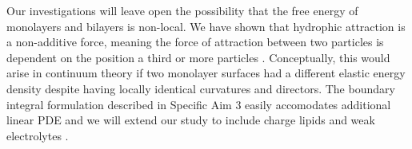  
%  
%

Our investigations will leave open the possibility that the free energy of monolayers and bilayers is non-local. 
We have shown that hydrophic attraction is a non-additive force, meaning the force of attraction between two
particles is dependent on the position a third or more particles \cite{SilveraBatista1242477}.
Conceptually, this would arise in continuum theory if two monolayer surfaces
had a different elastic energy density despite having locally identical curvatures and directors.
The boundary integral formulation described in Specific Aim 3 easily accomodates additional linear PDE and
we will extend our study to include charge lipids and weak electrolytes \cite{C9SM00772E}.



